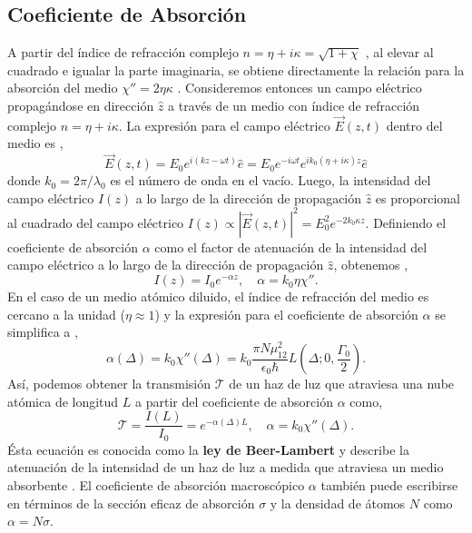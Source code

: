 \subsection{Coeficiente de Absorción}
A partir del índice de refracción complejo $n = \eta + i\kappa = \sqrt{1 + \chi}$ \cite{hechtOptics2017}, al elevar al cuadrado e igualar la parte imaginaria, se obtiene directamente la relación para la absorción del medio $\chi'' = 2\eta\kappa$ \cite{griffithsIntroductionElectrodynamics2013, demtroderLaserSpectroscopy1996}. Consideremos entonces un campo eléctrico propagándose en dirección $\hat{z}$ a través de un medio con índice de refracción complejo $n = \eta + i \kappa$. La expresión para el campo eléctrico $\vec{E}(z,t)$ dentro del medio es \cite{siddonsAbsoluteAbsorptionRubidium2008, keaveneyElecSusExtensionArbitrary2018},
\begin{equation*}
    \vec{E}(z,t) = E_0 e^{i(kz - \omega t)} \hat{e} =  E_0 e^{-i \omega t} e^{i k_0 (\eta + i \kappa) z} \hat{e} 
\end{equation*}
donde $k_0 = 2 \pi / \lambda_0$ es el número de onda en el vacío. Luego, la intensidad del campo eléctrico $I(z)$ a lo largo de la dirección de propagación $\hat{z}$ es proporcional al cuadrado del campo eléctrico $I(z) \propto |\vec{E}(z,t)|^2 = E_0^2 e^{- 2 k_0 \kappa z}$. Definiendo el coeficiente de absorción $\alpha$ como el factor de atenuación de la intensidad del campo eléctrico a lo largo de la dirección de propagación $\hat{z}$, obtenemos \cite{demtroderLaserSpectroscopy1996},   
\begin{equation*}
    I(z) = I_0 e^{-\alpha z}, \quad \alpha = k_0 \eta \chi''.
\end{equation*}
En el caso de un medio atómico diluido, el índice de refracción del medio es cercano a la unidad ($\eta \approx 1$) y la expresión para el coeficiente de absorción $\alpha$ se simplifica a \cite{robertw.boydNonlinearOptics},
\begin{equation}
    \alpha(\Delta) = k_0 \chi''(\Delta) = k_0 \frac{\pi N \mu_{12}^2}{\epsilon_0 \hbar} L\left(\Delta; 0, \frac{\Gamma_0}{2}\right).
\end{equation}
Así, podemos obtener la transmisión $\mathscr{T}$ de un haz de luz que atraviesa una nube atómica de longitud $L$ a partir del coeficiente de absorción $\alpha$ como,
\begin{equation}
    \boxed{
        \mathscr{T} = \frac{I(L)}{I_0} =  e^{-\alpha(\Delta) L}, \quad \alpha = k_0 \chi''(\Delta).
    }
\end{equation}
Ésta ecuación es conocida como la \textbf{ley de Beer-Lambert} y describe la atenuación de la intensidad de un haz de luz a medida que atraviesa un medio absorbente \cite{siddonsAbsoluteAbsorptionRubidium2008, footAtomicPhysics2005}. El coeficiente de absorción macroscópico $\alpha$ también puede escribirse en términos de la sección eficaz de absorción $\sigma$ y la densidad de átomos $N$ como $\alpha = N \sigma$.
